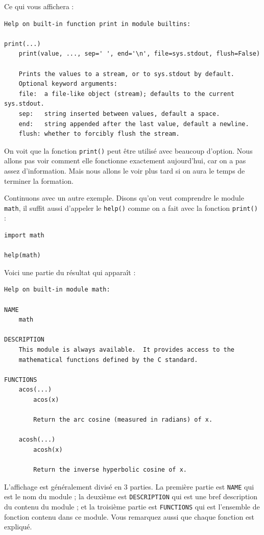 \documentclass[12pt]{article}
\newcommand{\code}[1]{\colorbox{light-gray}{\texttt{#1}}}
\begin{document}
        Ce qui vous affichera :
        \begin{lstlisting}[style=exec_result]
Help on built-in function print in module builtins:

print(...)
    print(value, ..., sep=' ', end='\n', file=sys.stdout, flush=False)
    
    Prints the values to a stream, or to sys.stdout by default.
    Optional keyword arguments:
    file:  a file-like object (stream); defaults to the current sys.stdout.
    sep:   string inserted between values, default a space.
    end:   string appended after the last value, default a newline.
    flush: whether to forcibly flush the stream.
        \end{lstlisting}

        On voit que la fonction \code{print()} peut être utilisé avec beaucoup d'option. Nous allons pas voir comment 
        elle fonctionne exactement aujourd'hui, car on a pas assez d'information. Mais nous allons le voir plus tard si
        on aura le temps de terminer la formation.

        Continuons avec un autre exemple. Disons qu'on veut comprendre le module \code{math}, il suffit aussi d'appeler
        le \code{help()} comme on a fait avec la fonction \code{print()} :
        \begin{lstlisting}[style=code]
import math

help(math) 
        \end{lstlisting}

        Voici une partie du résultat qui apparaît :
        \begin{lstlisting}[style=exec_result]
Help on built-in module math:

NAME
    math

DESCRIPTION
    This module is always available.  It provides access to the
    mathematical functions defined by the C standard.

FUNCTIONS
    acos(...)
        acos(x)
        
        Return the arc cosine (measured in radians) of x.
    
    acosh(...)
        acosh(x)
        
        Return the inverse hyperbolic cosine of x.
        \end{lstlisting}

        L'affichage est généralement divisé en 3 parties. La première partie est \code{NAME} qui est le nom du module ;
        la deuxième est \code{DESCRIPTION} qui est une bref description du contenu du module ; et la troisième partie
        est \code{FUNCTIONS} qui est l'ensemble de fonction contenu dans ce module. Vous remarquez aussi que 
        chaque fonction est expliqué.
\end{document}
